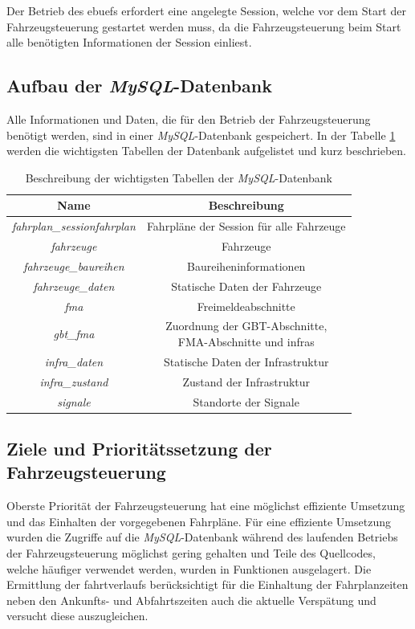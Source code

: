 Der Betrieb des \ac{ebuef}s erfordert eine angelegte Session, welche vor dem Start der Fahrzeugsteuerung gestartet werden muss, da die Fahrzeugsteuerung beim Start alle benötigten Informationen der Session einliest.
\subsection{Aufbau der \textit{MySQL}-Datenbank}
Alle Informationen und Daten, die für den Betrieb der Fahrzeugsteuerung benötigt werden, sind in einer \textit{MySQL}-Datenbank gespeichert. In der Tabelle \ref{table:sqldatenbank} werden die wichtigsten Tabellen der Datenbank aufgelistet und kurz beschrieben.
\begin{table}
\begin{center}
\renewcommand{\arraystretch}{1.2}
\begin{tabular}{c|c}
Name & Beschreibung \\ \hline
\textit{fahrplan\_sessionfahrplan}   	&   	Fahrpläne der Session für alle Fahrzeuge                  \\ \hline
\textit{fahrzeuge}                 		&   	Fahrzeuge                  \\ \hline
\textit{fahrzeuge\_baureihen}&   	Baureiheninformationen                  \\ \hline
\textit{fahrzeuge\_daten}      &   	Statische Daten der Fahrzeuge                  \\ \hline
\textit{fma}                 		&   	Freimeldeabschnitte                  \\ \hline
\textit{gbt\_fma}                 		&   	\makecell{Zuordnung der GBT-Abschnitte,\\FMA-Abschnitte und \acp{infra}}                   \\ \hline
\textit{infra\_daten}           &   	Statische Daten der Infrastruktur                  \\ \hline
\textit{infra\_zustand}       &   	Zustand der Infrastruktur                  \\ \hline
\textit{signale}                 		&   	Standorte der Signale                  \\
\end{tabular}
\renewcommand{\arraystretch}{1}
\caption{Beschreibung der wichtigsten Tabellen der \textit{MySQL}-Datenbank}
\label{table:sqldatenbank}
\end{center}
\end{table}
\subsection{Ziele und Prioritätssetzung der Fahrzeugsteuerung}
Oberste Priorität der Fahrzeugsteuerung hat eine möglichst effiziente Umsetzung und das Einhalten der vorgegebenen Fahrpläne. Für eine effiziente Umsetzung wurden die Zugriffe auf die \textit{MySQL}-Datenbank während des laufenden Betriebs der Fahrzeugsteuerung möglichst gering gehalten und Teile des Quellcodes, welche häufiger verwendet werden, wurden in Funktionen ausgelagert. Die Ermittlung der \glspl{fahrtverlauf} berücksichtigt für die Einhaltung der Fahrplanzeiten neben den Ankunfts- und Abfahrtszeiten auch die aktuelle Verspätung und versucht diese auszugleichen.

